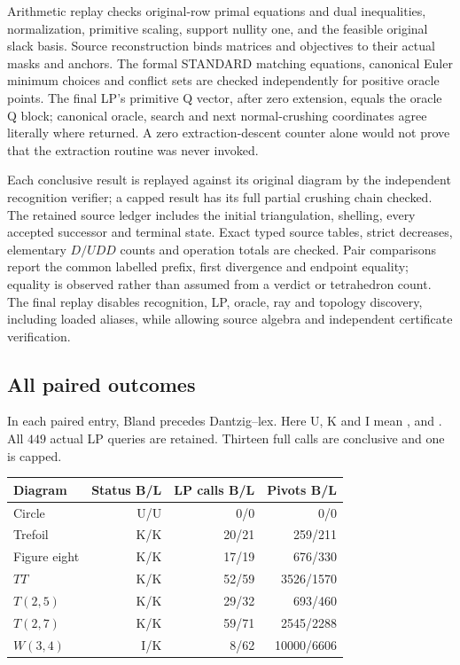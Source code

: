 Arithmetic replay checks original-row primal equations and dual inequalities,
normalization, primitive scaling, support nullity one, and the feasible
original slack basis.  Source reconstruction binds matrices and objectives
to their actual masks and anchors.  The formal STANDARD matching equations,
canonical Euler minimum choices and conflict sets are checked independently
for positive oracle points.  The final LP's primitive Q vector, after zero
extension, equals the oracle Q block; canonical oracle, search and next
normal-crushing coordinates agree literally where returned.
A zero extraction-descent counter alone would not prove that
the extraction routine was never invoked.

Each conclusive result is replayed against its original diagram by the
independent recognition verifier; a capped result has its full partial
crushing chain checked.  The retained source ledger includes the initial
triangulation, shelling, every accepted successor and terminal state.  Exact
typed source tables, strict decreases, elementary $D/UDD$ counts and operation
totals are checked.  Pair comparisons report the common labelled prefix,
first divergence and endpoint equality; equality is observed rather than
assumed from a verdict or tetrahedron count.  The final replay disables
recognition, LP, oracle, ray and topology discovery, including loaded aliases,
while allowing source algebra and independent certificate verification.

\subsection{All paired outcomes}

In each paired entry, Bland precedes Dantzig--lex.  Here U, K and I mean
,  and .  All $449$ actual LP
queries are retained.  Thirteen full calls are conclusive and one is capped.
\begin{center}
\begin{tabular}{lrrr}
\toprule
Diagram & Status B/L & LP calls B/L & Pivots B/L\\
\midrule
Circle & U/U & 0/0 & 0/0\\
Trefoil & K/K & 20/21 & 259/211\\
Figure eight & K/K & 17/19 & 676/330\\
$TT$ & K/K & 52/59 & 3526/1570\\
$T(2,5)$ & K/K & 29/32 & 693/460\\
$T(2,7)$ & K/K & 59/71 & 2545/2288\\
$W(3,4)$ & I/K & 8/62 & 10000/6606\\
\bottomrule
\end{tabular}
\end{center}


